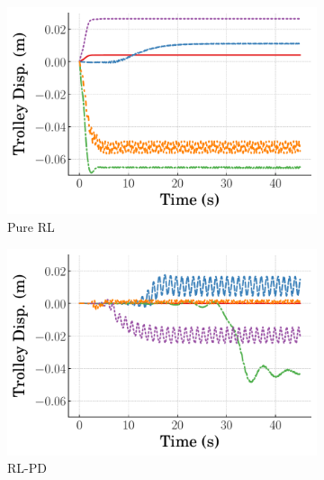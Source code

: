 \begin{figure}[tb]
  \centering
  \begin{subfigure}[b]{0.49\textwidth}
      \centering
      \includegraphics[width=\textwidth]{figures/figures_stability/time_responses_crane/dpcrane_pure_RL/Cart_displacement_0_init_300000_steps.pdf}
      \caption{Pure RL}
      \label{subfig_chap3:dpcrane_RL_alone_near_equil_trolley}
  \end{subfigure}
  \hfill
  \begin{subfigure}[b]{0.49\textwidth}
    \centering
    \includegraphics[width=\textwidth]{figures/figures_stability/time_responses_crane/dpcrane_cont_gain_sched/Cart_displacement_0.0001_init_300000_steps.pdf}
    \caption{RL-PD}
    \label{subfig_chap3:dpcrane_RL_PD_near_equil_trolley}
  \end{subfigure}
  \hfill
  \begin{subfigure}[b]{0.49\textwidth}

\end{subfigure}
\end{figure}

